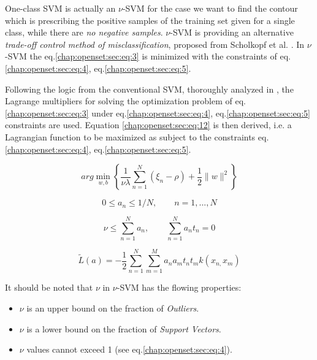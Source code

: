 One-class SVM is actually an $\nu$-SVM for the case we want to find the contour which is prescribing the positive samples of the training set given for a single class, while there are \textit{no negative samples}. $\nu$-SVM is providing an alternative \textit{trade-off control method of misclassification}, proposed from Scholkopf et al. \parencite{scholkopf1999estimating}. In $\nu$-SVM the eq.\ref{chap:openset:sec:eq:3} is minimized with the constraints of eq.\ref{chap:openset:sec:eq:4}, eq.\ref{chap:openset:sec:eq:5}.

Following the logic from the conventional SVM, thoroughly analyzed in \parencite{bishop2006}, the Lagrange multipliers for solving the optimization problem of eq.\ref{chap:openset:sec:eq:3} under eq.\ref{chap:openset:sec:eq:4}, eq.\ref{chap:openset:sec:eq:5} constraints are used. Equation \ref{chap:openset:sec:eq:12} is then derived, i.e. a Lagrangian function to be maximized as subject to the constraints eq.\ref{chap:openset:sec:eq:4}, eq.\ref{chap:openset:sec:eq:5}.

\begin{equation}\label{chap:openset:sec:eq:3}
	arg\min_{w,b}\left\{ \frac{1}{\nu\lambda}\sum_{n=1}^{N}(\xi_{n}-\rho)+\frac{1}{2}\|w\|^{2}\right\}
\end{equation}

\begin{equation}\label{chap:openset:sec:eq:4}
	0\leqslant a_{n}\leqslant1/N,\qquad n=1,...,N
\end{equation}

\begin{equation}\label{chap:openset:sec:eq:5}
	\nu\leqslant\sum_{n=1}^{N}a_{n}, \qquad \sum_{n=1}^{N}a_{n}t_{n}=0
\end{equation}

\begin{equation}\label{chap:openset:sec:eq:12}
	\widetilde{L}(a)=-\frac{1}{2}\sum_{n=1}^{N}\sum_{m=1}^{M}a_{n}a_{m}t_{n}t_{m}k(x_{n,}x_{m})
\end{equation}

\newpage


It should be noted that $\nu$ in $\nu$-SVM has the flowing properties:
\begin{itemize}
	\item $\nu$ is an upper bound on the fraction of \textit{Outliers}.
	\item $\nu$ is a lower bound on the fraction of \textit{Support Vectors}.
	\item $\nu$ values cannot exceed 1 (see eq.\ref{chap:openset:sec:eq:4}).
\end{itemize}

